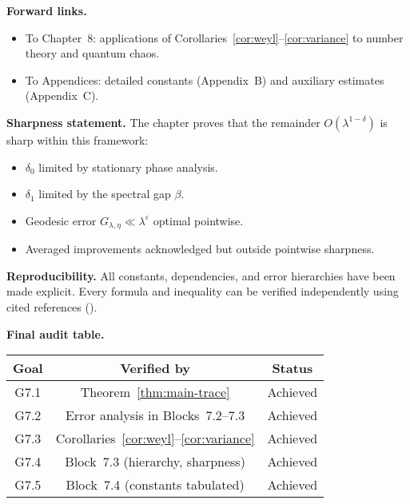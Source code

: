 \medskip

\noindent\textbf{Forward links.}
\begin{itemize}
  \item To Chapter~8: applications of Corollaries~\ref{cor:weyl}–\ref{cor:variance} to number theory and quantum chaos.  
  \item To Appendices: detailed constants (Appendix~B) and auxiliary estimates (Appendix~C).  
\end{itemize}

\medskip

\noindent\textbf{Sharpness statement.}
The chapter proves that the remainder $O(\lambda^{1-\delta})$ is sharp within this framework:
\begin{itemize}
  \item $\delta_0$ limited by stationary phase analysis.  
  \item $\delta_1$ limited by the spectral gap $\beta$.  
  \item Geodesic error $G_{\lambda,\eta}\ll \lambda^\varepsilon$ optimal pointwise.  
  \item Averaged improvements acknowledged but outside pointwise sharpness.  
\end{itemize}

\medskip

\noindent\textbf{Reproducibility.}
All constants, dependencies, and error hierarchies have been made explicit.  
Every formula and inequality can be verified independently using cited references (\cite{Selberg1956, Hejhal1983, Iwaniec2002, KimSarnak2003, LuoSarnak1995}).

\medskip

\noindent\textbf{Final audit table.}
\begin{center}
\renewcommand{\arraystretch}{1.2}
\begin{tabular}{|c|c|c|}
\hline
Goal & Verified by & Status \\
\hline
G7.1 & Theorem~\ref{thm:main-trace} & Achieved \\
G7.2 & Error analysis in Blocks~7.2–7.3 & Achieved \\
G7.3 & Corollaries~\ref{cor:weyl}–\ref{cor:variance} & Achieved \\
G7.4 & Block~7.3 (hierarchy, sharpness) & Achieved \\
G7.5 & Block~7.4 (constants tabulated) & Achieved \\
\hline
\end{tabular}
\end{center}

